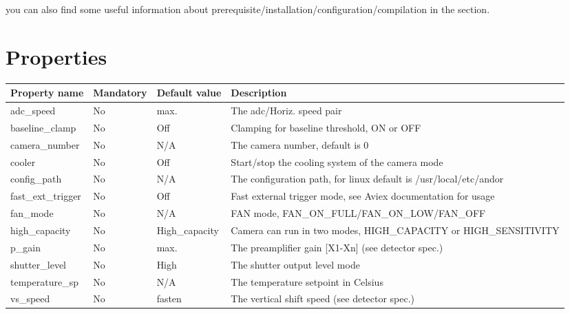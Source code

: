 \documentclass[letterpaper,10pt,english]{sphinxmanual}
\begin{document}
you can also find some useful information about prerequisite/installation/configuration/compilation in the  section.


\section{Properties}
\label{AviexCCD/aviexccd:properties}
\begin{tabulary}{\linewidth}{|L|L|L|L|}
\hline
\textsf{\relax 
Property name
} & \textsf{\relax 
Mandatory
} & \textsf{\relax 
Default value
} & \textsf{\relax 
Description
}\\
\hline
adc\_speed
 & 
No
 & 
max.
 & 
The adc/Horiz. speed pair
\\
\hline
baseline\_clamp
 & 
No
 & 
Off
 & 
Clamping for baseline threshold, ON or OFF
\\
\hline
camera\_number
 & 
No
 & 
N/A
 & 
The camera number,  default is  0
\\
\hline
cooler
 & 
No
 & 
Off
 & 
Start/stop the cooling system of the camera mode
\\
\hline
config\_path
 & 
No
 & 
N/A
 & 
The configuration path, for linux default is /usr/local/etc/andor
\\
\hline
fast\_ext\_trigger
 & 
No
 & 
Off
 & 
Fast external trigger mode, see Aviex documentation for usage
\\
\hline
fan\_mode
 & 
No
 & 
N/A
 & 
FAN mode, FAN\_ON\_FULL/FAN\_ON\_LOW/FAN\_OFF
\\
\hline
high\_capacity
 & 
No
 & 
High\_capacity
 & 
Camera can run in two modes, HIGH\_CAPACITY or HIGH\_SENSITIVITY
\\
\hline
p\_gain
 & 
No
 & 
max.
 & 
The preamplifier gain {[}X1-Xn{]} (see detector spec.)
\\
\hline
shutter\_level
 & 
No
 & 
High
 & 
The shutter output level mode
\\
\hline
temperature\_sp
 & 
No
 & 
N/A
 & 
The temperature setpoint in Celsius
\\
\hline
vs\_speed
 & 
No
 & 
fasten
 & 
The vertical shift speed (see detector spec.)
\\
\hline\end{tabulary}
\end{document}
